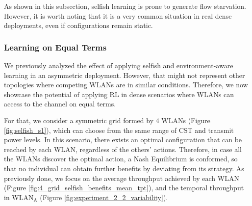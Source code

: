 \documentclass[preprint,12pt]{elsarticle}
\begin{document}
As shown in this subsection, selfish learning is prone to generate flow starvation. However, it is worth noting that it is a very common situation in real dense deployments, even if configurations remain static.

\subsubsection{Learning on Equal Terms}
\label{subsubsection:resources_maximization}

We previously analyzed the effect of applying selfish and environment-aware learning in an asymmetric deployment. However, that might not represent other topologies where competing WLANs are in similar conditions. Therefore, we now showcase the potential of applying RL in dense scenarios where WLANs can access to the channel on equal terms. 

For that, we consider a symmetric grid formed by 4 WLANs (Figure \ref{fig:selfish_s1}), which can choose from the same range of CST and transmit power levels. In this scenario, there exists an optimal configuration that can be reached by each WLAN, regardless of the others' actions. Therefore, in case all the WLANs discover the optimal action, a Nash Equilibrium is conformed, so that no individual can obtain further benefits by deviating from its strategy. As previously done, we focus on the average throughput achieved by each WLAN (Figure \ref{fig:4_grid_selfish_benefits_mean_tpt}), and the temporal throughput in $\text{WLAN}_\text{A}$ (Figure \ref{fig:experiment_2_2_variability}).
\end{document}
